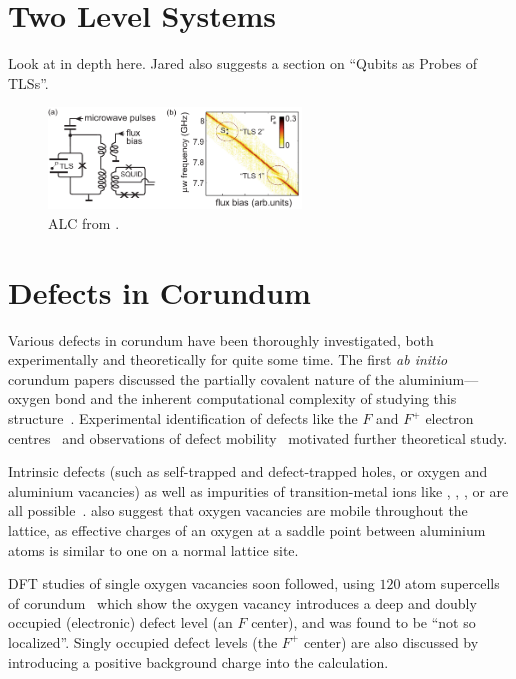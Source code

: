 \section{Two Level Systems}
Look at \cite{Enss2005} in depth here.
Jared also suggests a section on ``Qubits as Probes of TLSs''.



\begin{figure}[htp]
\includegraphics[width=0.6\textwidth]{figures/alclisenfeld2010}
\caption[ALC]{\label{fig:alc}ALC from \citeauthor{Lisenfeld2010}.}
\end{figure}



\section{Defects in Corundum}\label{sec:cordef}
Various defects in corundum have been thoroughly investigated, both experimentally and theoretically for quite some time.
The first \emph{ab initio} corundum papers discussed the partially covalent nature of the aluminium---oxygen bond and the inherent computational complexity of studying this structure~\cite{Causa1987}.
Experimental identification of defects like the $F$
and $F^+$ electron centres~\cite{Kotomin1989} and observations of defect mobility~\cite{Kulis1991} motivated further theoretical study.

Intrinsic defects (such as self-trapped and defect-trapped holes, or oxygen and aluminium vacancies) as well as impurities of transition-metal ions like , , ,  or  are all possible~\cite{Jacobs1994}.
\citeauthor{Jacobs1994} also suggest that oxygen vacancies are mobile throughout the lattice, as effective charges of an oxygen at a saddle point between aluminium atoms is similar to one on a normal lattice site.

DFT studies of single oxygen vacancies soon followed, using $120$ atom supercells of corundum~\cite{Xu1997} which show the oxygen vacancy introduces a deep and doubly occupied (electronic) defect level (an $F$ center), and was found to be ``not so localized''.
Singly occupied defect levels (the $F^+$ center) are also discussed by introducing a positive background charge into the calculation.

